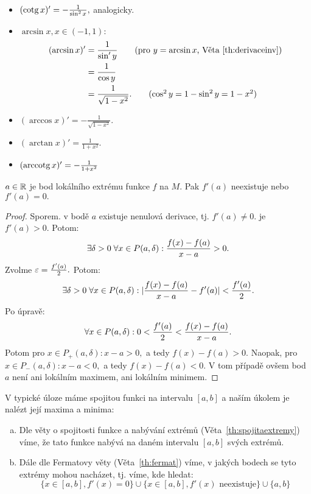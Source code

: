 \begin{remark}
\begin{itemize}
        \item $(\operatorname{cotg} x)' = - \frac{1}{\sin^2 x},$ analogicky.
        \item $\arcsin x, x \in (-1, 1):$
            \begin{align*}
                (\arcsin x)' &= \frac{1}{\sin' y} \tag{pro $y = \arcsin x$, Věta~\ref{th:derivaceinv}} \\
                             &= \frac{1}{\cos y} \\
                             &= \frac{1}{\sqrt{1 - x^2}}. \tag{$\cos^2 y = 1 - \sin^2 y = 1 - x^2$}
            \end{align*}
        \item $(\arccos x)' = -\frac{1}{\sqrt{1 - x^2}}.$
        \item $(\arctan x)' = \frac{1}{1 + x^2}.$
        \item $(\operatorname{arccotg} x)' = - \frac{1}{1 + x^2}$
    \end{itemize}
\end{remark}

\begin{theorem}[Fermatova]
    \label{th:fermat}
    \Necht $a \in \mathbb{R}$ je bod lokálního extrému funkce $f$ na $M.$ Pak $f'(a)$ 
    neexistuje nebo $f'(a) = 0.$
\end{theorem}

\begin{proof}
    Sporem. \Necht v bodě $a$ existuje nenulová derivace, tj. 
    $f'(a) \neq 0.$ \Necht je \buno $f'(a) > 0.$ Potom:
    $$\exists \delta > 0 \; \forall x \in P(a, \delta): \frac{f(x) - f(a)}{x-a} > 0.$$
    Zvolme $\varepsilon = \frac{f'(a)}{2}.$ Potom:
    $$\exists \delta > 0 \; \forall x \in P(a, \delta): 
        |\frac{f(x) - f(a)}{x-a} - f'(a)| < \frac{f'(a)}{2}.$$
    Po úpravě:
    $$\forall x \in P(a, \delta): 0 < \frac{f'(a)}{2} < \frac{f(x) - f(a)}{x-a}.$$
    Potom pro $x \in P_+(a, \delta): x - a> 0,$ a tedy $f(x) - f(a) > 0.$ Naopak,
    pro $x \in P_-(a, \delta): x - a < 0,$ a tedy $f(x) - f(a) < 0.$
    V tom případě ovšem bod $a$ není ani lokálním maximem, ani lokálním minimem.
\end{proof}

\begin{remark}
    V typické úloze máme spojitou funkci na intervalu $[a,b]$ a naším úkolem je
    nalézt její maxima a minima:
    \begin{enumerate}[a.]
        \item Dle věty o spojitosti funkce a nabývání extrémů 
            (Věta~\ref{th:spojitaextremy}) víme, že tato funkce nabývá na daném
            intervalu $[a,b]$ svých extrémů.
        \item Dále dle Fermatovy věty (Věta~\ref{th:fermat}) víme, v jakých 
            bodech se tyto extrémy mohou nacházet, tj. víme, kde hledat:
            $$\{x \in [a,b], f'(x) = 0 \} 
            \cup \{x \in [a,b], f'(x) \text{ neexistuje}\}
            \cup \{a,b\}$$
    \end{enumerate}
\end{remark}

